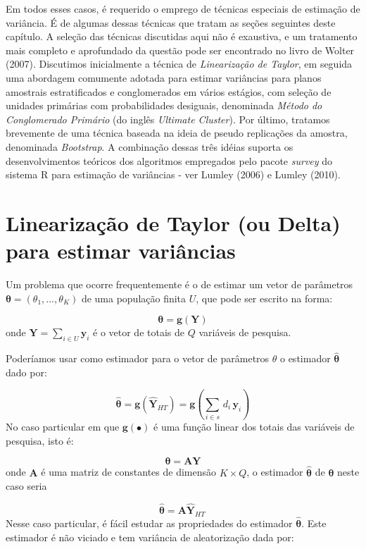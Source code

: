 \documentclass[
  12pt,
  brazilian,
]{book}
\theoremstyle{definition}
\theoremstyle{definition}
\theoremstyle{definition}
\theoremstyle{definition}
\theoremstyle{remark}
\begin{document}
Em todos esses casos, é requerido o emprego de técnicas especiais de estimação de variância. É de algumas dessas técnicas que tratam as seções seguintes deste capítulo. A seleção das técnicas discutidas aqui não é exaustiva, e um tratamento
mais completo e aprofundado da questão pode ser encontrado no livro de Wolter (2007).
Discutimos inicialmente a técnica de \emph{Linearização de Taylor}, em seguida uma abordagem comumente adotada para estimar variâncias para planos amostrais estratificados e conglomerados em vários estágios, com seleção de unidades primárias com probabilidades desiguais, denominada \emph{Método do Conglomerado Primário} (do inglês \emph{Ultimate Cluster}). Por último, tratamos brevemente de uma técnica baseada na ideia de pseudo replicações da amostra, denominada \emph{Bootstrap}. A combinação dessas três idéias suporta os desenvolvimentos teóricos dos algoritmos empregados pelo pacote \emph{survey} do sistema R para estimação de variâncias - ver Lumley (2006) e Lumley (2010).

\hypertarget{taylor}{%
\section{Linearização de Taylor (ou Delta) para estimar variâncias}\label{taylor}}

Um problema que ocorre frequentemente é o de estimar um vetor de parâmetros
\(\mathbf{\theta} = \left( \theta _{1},\ldots ,\theta_{K}\right)\) de uma população finita \(U\), que pode ser escrito na forma:

\[
\mathbf{\theta} = \mathbf{g}(\mathbf{Y}) 
\]
onde \(\mathbf{Y} = \sum_{i \in U} \mathbf{y}_i\) é o vetor de totais de \(Q\) variáveis de pesquisa.

Poderíamos usar como estimador para o vetor de parâmetros \(\theta\) o estimador \(\mathbf{\widehat{\theta}}\) dado por:

\[
\mathbf{\widehat{\theta}} = \mathbf{g} \left( \widehat{ \mathbf{Y}}_{HT} \right) = \mathbf{g} \left(\sum_{i \in s} \, d_i \, \mathbf{y}_{i} \right)  
\]
No caso particular em que \(\mathbf{g}(\bullet)\) é uma função linear dos totais das variáveis de pesquisa, isto é:

\[
\mathbf{\theta} = \mathbf{A Y}  
\]
onde \(\mathbf{A}\) é uma matriz de constantes de dimensão \(K \times Q\), o estimador
\(\mathbf{\widehat{\theta}}\) de \(\mathbf{\theta}\) neste caso seria

\[
\mathbf{\widehat{\theta}} = \mathbf{A \widehat{Y}}_{HT} \,
\]
Nesse caso particular, é fácil estudar as propriedades do estimador \(\mathbf{\widehat{\theta}}\). Este estimador é não viciado e tem variância de aleatorização dada por:
\end{document}
